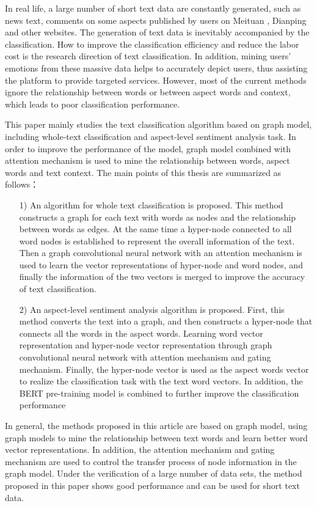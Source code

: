 
\begin{englishabstract}
	In real life, a large number of short text data are constantly generated, such as news text, comments on some aspects published by users on Meituan , Dianping and other websites.
	 The generation of text data is inevitably accompanied by the classification. 
	How to improve the classification efficiency and reduce the labor cost is the research direction of text classification.
	In addition, mining users' emotions from these massive data helps to accurately depict users, thus assisting the platform to provide targeted services. 
	However, most of the current methods ignore the relationship between words or between aspect words and context, which leads to poor classification performance. 

	This paper mainly studies the text classification algorithm based on graph model, including whole-text classification and aspect-level sentiment analysis task. 
	In order to improve the performance of the model, graph model combined with attention mechanism is used to mine the relationship between words, aspect words and text context. The main points of this thesis are summarized as follows：

	\begin{itemize}
		\item [1)] 
		An algorithm for whole text classification is proposed. This method constructs a graph for each text with words as nodes and the relationship between words as edges. 
		At the same time a hyper-node connected to all word nodes is established to represent the overall information of the text. 
		Then a graph convolutional neural network with an attention mechanism is used to learn the vector representations of hyper-node and word nodes, and finally the information of the two vectors is merged to improve the accuracy of text classification.
		\item [2)] 
		An aspect-level sentiment analysis algorithm is proposed. First, this method converts the text into a graph, and then constructs a hyper-node that connects all the words in the aspect words. 
		Learning word vector representation and hyper-node vector representation through graph convolutional neural network with attention mechanism and gating mechanism. 
		Finally, the hyper-node vector is used as the aspect words vector to realize the classification task with the text word vectors. 
		In addition, the BERT pre-training model is combined to further improve the classification performance
	\end{itemize}

	In general, the methods proposed in this article are based on graph model, using graph models to mine the relationship between text words and learn better word vector representations. 
	In addition, the attention mechanism and gating mechanism are used to control the transfer process of node information in the graph model. 
	Under the verification of a large number of data sets, the method proposed in this paper shows good performance and can be used for short text data.

\end{englishabstract}



